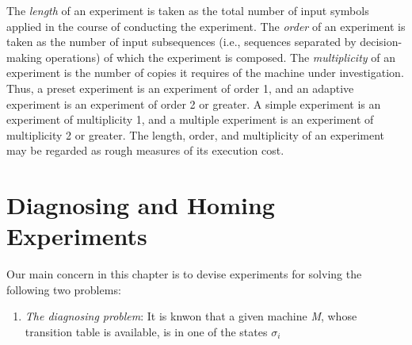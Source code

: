 \begin{enumerate}
    The \emph{length} of an experiment is taken as the total number of input symbols applied in the course of conducting the experiment. The \emph{order} of an experiment is taken as the number of input subsequences (i.e., sequences separated by decision-making operations) of which the experiment is composed. The \emph{multiplicity} of an experiment is the number of copies it requires of the machine under investigation. Thus, a preset experiment is an experiment of order 1, and an adaptive experiment is an experiment of order 2 or greater. A simple experiment is an experiment of multiplicity 1, and a multiple experiment is an experiment of multiplicity 2 or greater. The length, order, and multiplicity of an experiment may be regarded as rough measures of its execution cost.

\section{Diagnosing and Homing Experiments}

    Our main concern in this chapter is to devise experiments for solving the following two problems:
\begin{enumerate}
    \item \emph{The diagnosing problem}: It is knwon that a given machine \emph{M}, whose transition table is available, is in one of the states $ \sigma_{i_{}} $
\end{enumerate}

\end{enumerate}
